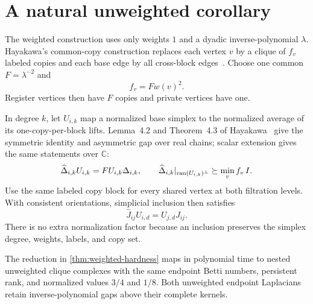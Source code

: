 \section{A natural unweighted corollary}
\label{sec:unweighting}

The weighted construction uses only weights \(1\) and a dyadic
inverse-polynomial \(\lambda\).  Hayakawa's common-copy construction replaces
each vertex \(v\) by a clique of \(f_v\) labeled copies and each base edge by
all cross-block edges~\cite{hayakawa2026unweighted}.  Choose one common
\(F=\lambda^{-2}\) and
\[
f_v=Fw(v)^2.
\]
Register vertices then have \(F\) copies and private vertices have one.

In degree \(k\), let \(U_{i,k}\) map a normalized base simplex to the
normalized average of its one-copy-per-block lifts.  Lemma~4.2 and
Theorem~4.3 of Hayakawa~\cite{hayakawa2026unweighted} give the symmetric
identity and asymmetric gap over real chains; scalar extension gives the same
statements over \(\mathbb C\):
\begin{equation}
\label{eq:unweight-operator}
\widehat\Delta_{i,k}U_{i,k}=FU_{i,k}\Delta_{i,k},
\qquad
\widehat\Delta_{i,k}|_{\operatorname{ran}(U_{i,k})^\perp}\succeq
\min_v f_v\,I.
\end{equation}
Use the same labeled copy block for every shared vertex at both filtration
levels.  With consistent orientations, simplicial inclusion then satisfies
\begin{equation}
\label{eq:unweight-natural}
\widehat J_{ij}U_{i,d}=U_{j,d}J_{ij}.
\end{equation}
There is no extra normalization factor because an inclusion preserves the
simplex degree, weights, labels, and copy set.

\begin{corollary}
\label{cor:unweighted-hardness}
The reduction in \cref{thm:weighted-hardness} maps in polynomial time to
nested unweighted clique complexes with the same endpoint Betti numbers,
persistent rank, and normalized values \(3/4\) and \(1/8\).  Both unweighted
endpoint Laplacians retain inverse-polynomial gaps above their complete
kernels.
\end{corollary}

